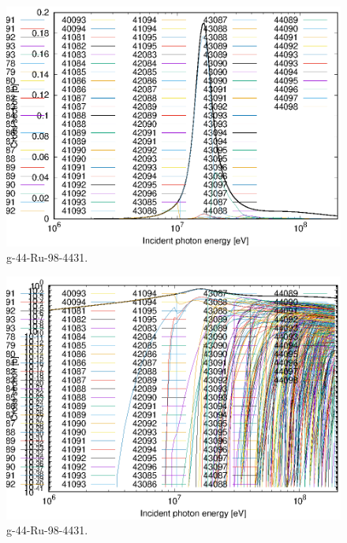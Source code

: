 \begin{figure}
 \includegraphics[width=\linewidth]{eps/g_44-Ru-98_4431.eps}
  \caption{g-44-Ru-98-4431.}
\end{figure}
\begin{figure}
 \includegraphics[width=\linewidth]{eps-log/g_44-Ru-98_4431.eps}
 \caption{g-44-Ru-98-4431.}
\end{figure}
\newpage \clearpage


